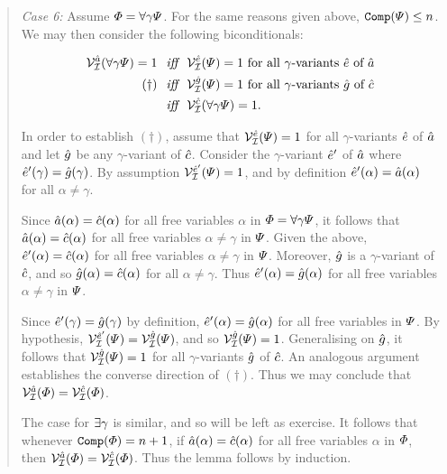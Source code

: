 \begin{quote}
  \textit{Case 6:} Assume $\varPhi=\forall \gamma\varPsi$.
  For the same reasons given above, $\texttt{Comp}(\varPsi)\leq n$.
  We may then consider the following biconditionals:

  \vspace{-.2in}
  \begin{align*}
    \mathcal{V}_{\mathcal{I}}^{\hat{a}}(\forall \gamma\varPsi)=1 &\textit{ ~iff~ } \mathcal{V}_{\mathcal{I}}^{\hat{e}}(\varPsi)=1 \text{ for all } \gamma\text{-variants } \hat{e} \text{ of } \hat{a}\\ 
      (\dagger) &\textit{ ~iff~ } \mathcal{V}_{\mathcal{I}}^{\hat{g}}(\varPsi)=1 \text{ for all } \gamma\text{-variants } \hat{g} \text{ of } \hat{c}\\  
      &\textit{ ~iff~ } \mathcal{V}_{\mathcal{I}}^{\hat{c}}(\forall \gamma\varPsi)=1.
  \end{align*}

  In order to establish $(\dagger)$, assume that $\mathcal{V}_{\mathcal{I}}^{\hat{e}}(\varPsi)=1$ for all $\gamma$-variants $\hat{e}$ of $\hat{a}$ and let $\hat{g}$ be any $\gamma$-variant of $\hat{c}$.
  Consider the $\gamma$-variant $\hat{e}'$ of $\hat{a}$ where $\hat{e}'(\gamma)=\hat{g}(\gamma)$.
  By assumption $\mathcal{V}_{\mathcal{I}}^{\hat{e}'}(\varPsi)=1$, and by definition $\hat{e}'(\alpha)=\hat{a}(\alpha)$ for all $\alpha\neq\gamma$.

  Since $\hat{a}(\alpha)=\hat{c}(\alpha)$ for all free variables $\alpha$ in $\varPhi=\forall \gamma\varPsi$, it follows that $\hat{a}(\alpha)=\hat{c}(\alpha)$ for all free variables $\alpha\neq\gamma$ in $\varPsi$.
  Given the above, $\hat{e}'(\alpha)=\hat{c}(\alpha)$ for all free variables $\alpha\neq\gamma$ in $\varPsi$. 
  Moreover, $\hat{g}$ is a $\gamma$-variant of $\hat{c}$, and so $\hat{g}(\alpha)=\hat{c}(\alpha)$ for all $\alpha\neq\gamma$.
  Thus $\hat{e}'(\alpha)=\hat{g}(\alpha)$ for all free variables $\alpha\neq\gamma$ in $\varPsi$. 

  Since $\hat{e}'(\gamma)=\hat{g}(\gamma)$ by definition, $\hat{e}'(\alpha)=\hat{g}(\alpha)$ for all free variables in $\varPsi$.  
  By hypothesis, $\mathcal{V}_{\mathcal{I}}^{\hat{e}'}(\varPsi)=\mathcal{V}_{\mathcal{I}}^{\hat{g}}(\varPsi)$, and so $\mathcal{V}_{\mathcal{I}}^{\hat{g}}(\varPsi)=1$.
  Generalising on $\hat{g}$, it follows that $\mathcal{V}_{\mathcal{I}}^{\hat{g}}(\varPsi)=1$ for all $\gamma$-variants $\hat{g}$ of $\hat{c}$.
  An analogous argument establishes the converse direction of $(\dagger)$.
  Thus we may conclude that $\mathcal{V}_{\mathcal{I}}^{\hat{a}}(\varPhi)=\mathcal{V}_{\mathcal{I}}^{\hat{c}}(\varPhi)$.

  The case for $\exists \gamma$ is similar, and so will be left as exercise.
  It follows that whenever $\texttt{Comp}(\varPhi)=n+1$, if $\hat{a}(\alpha)=\hat{c}(\alpha)$ for all free variables $\alpha$ in $\varPhi$, then $\mathcal{V}_{\mathcal{I}}^{\hat{a}}(\varPhi)=\mathcal{V}_{\mathcal{I}}^{\hat{c}}(\varPhi)$.
  Thus the lemma follows by induction.
\end{quote}






